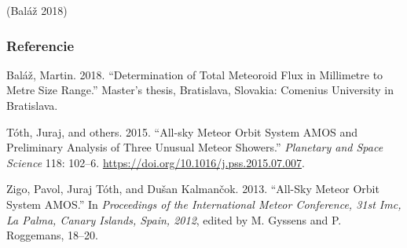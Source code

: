 (Baláž 2018)

\subsubsection*{Referencie}\label{referencie}

\hypertarget{refs}{}
\hypertarget{ref-balaz2018}{}
Baláž, Martin. 2018. ``Determination of Total Meteoroid Flux in
Millimetre to Metre Size Range.'' Master's thesis, Bratislava, Slovakia:
Comenius University in Bratislava.

\hypertarget{ref-toth2015}{}
Tóth, Juraj, and others. 2015. ``All-sky Meteor Orbit System AMOS and
Preliminary Analysis of Three Unusual Meteor Showers.'' \emph{Planetary
and Space Science} 118: 102--6.
\url{https://doi.org/10.1016/j.pss.2015.07.007}.

\hypertarget{ref-zigo2013}{}
Zigo, Pavol, Juraj Tóth, and Dušan Kalmančok. 2013. ``All-Sky Meteor
Orbit System AMOS.'' In \emph{Proceedings of the International Meteor
Conference, 31st Imc, La Palma, Canary Islands, Spain, 2012}, edited by
M. Gyssens and P. Roggemans, 18--20.
